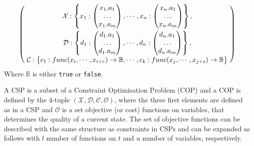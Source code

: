 \begin{align*}
\begin{pmatrix}\vspace{3pt}
	\mathcal{X} :
	\begin{Bmatrix}
		x_1 :
		\begin{pmatrix}
			x_1.a_1\\
			\ldots\\
			x_1.a_m\\
		\end{pmatrix}
		, \cdots,
		x_n :
		\begin{pmatrix}
			x_n.a_1\\
			\ldots\\
			x_n.a_m\\
		\end{pmatrix}
	\end{Bmatrix},\\\vspace{1pt}
	\mathcal{D} :
	\begin{Bmatrix}
		d_1 :
		\begin{pmatrix}
			d_1.a_1\\
			\ldots\\
			d_1.a_m\\
		\end{pmatrix}
		, \cdots,
		d_n :
		\begin{pmatrix}
			d_n.a_1\\
			\ldots\\
			d_n.a_m\\
		\end{pmatrix}
	\end{Bmatrix},\\\hspace{3pt}
	\mathcal{C} :
	\begin{Bmatrix}
		c_1 : func(x_i, \cdots,x_{i+r}) \rightarrow \mathbb{B}, \cdots, c_k : func(x_j, \cdots,x_{j+s}) \rightarrow \mathbb{B}
	\end{Bmatrix}\hspace{3pt}
\end{pmatrix}
\end{align*}
Where $\mathbb{B}$ is either \texttt{true} or \texttt{false}.

A CSP is a subset of a Constraint Optimisation Problem (COP) and a COP is defined by the 4-tuple $(\mathcal{X}, \mathcal{D}, \mathcal{C}, \mathcal{O})$, where the three first elements are defined as in a CSP and $\mathcal{O}$ is a set objective (or cost) functions on variables, that determines the quality of a current state. The set of objective functions can be described with the same structure as constraints in CSPs and can be expanded as follows with $l$ number of functions on $t$ and $u$ number of variables, respectively.

